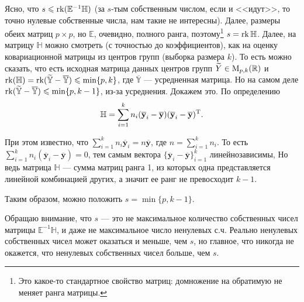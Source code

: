 Ясно, что $s \leqslant \operatorname{rk}(\mathbb E^{-1} \mathbb H)$ (за $s$-тым собственным числом, если и <<идут>>, то точно нулевые собственные числа, нам такие не интересны).
Далее, размеры обеих матриц $p \times p$, но $\mathbb E$, очевидно, полного ранга, поэтому\footnote{\color{blue} Это какое-то стандартное свойство матриц: домножение
на обратимую не меняет ранга матрицы.}
$s = \operatorname{rk}{\mathbb H}$. Далее, на матрицу $\mathbb H$ можно смотреть (с точностью до коэффициентов), как на оценку ковариационной матрицы из центров групп (выборка размера $k$).
То есть можно сказать, что есть исходная матрица данных центров групп $\widetilde Y \in \mathrm M_{p, k}(\mathbb{R})$ и $\operatorname{rk}(\mathbb H) = \operatorname{rk}(\mathbb {\widetilde Y} - \mathbb{\overline Y}) \leqslant \min\{p, k\}$,
где $\overline {\mathbb Y}$ --- усредненная матрица.
Но на самом деле $\operatorname{rk}(\mathbb {\widetilde Y} - \mathbb{\overline Y}) \leqslant \min\{p, k - 1\}$, из-за усреднения. Докажем это. По определению
\begin{gather*}
    \mathbb H = \sum_{i=1}^k n_i (\mathbf {\overline y}_{i} - \mathbf {\overline y}) (\mathbf {\overline y}_{i} - \mathbf {\overline y})^{\mathrm{T}}.
\end{gather*}

При этом известно, что $\sum_{i=1}^k n_i \mathbf {\overline y}_i = n \mathbf {\overline y}$, где $n = \sum_{i=1}^k n_i$.
То есть $\sum_{i = 1}^k n_i (\mathbf {\overline y}_i  - \mathbf {\overline y}) = 0$, тем самым вектора $\{\mathbf {\overline y}_i  - \mathbf {\overline y}\}_{i=1}^k$ линейнозависимы,
Но ведь матрица $\mathbb H$ --- сумма матриц ранга 1, из которых одна представляется линейной комбинацией других, а значит ее ранг не превосходит $k - 1$.

Таким образом, можно положить $s = \min\{p, k - 1\}$.

Обращаю внимание, что $s$ --- это не максимальное количество собственных чисел матрицы $\mathbb E^{-1} \mathbb H$, и даже не максимальное число ненулевых с.ч.
Реально ненулевых собственных чисел может оказаться и меньше, чем $s$, но главное, что никогда не окажется, что ненулевых собственных чисел больше, чем $s$.
